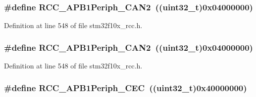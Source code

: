 \subsubsection[{\texorpdfstring{R\+C\+C\+\_\+\+A\+P\+B1\+Periph\+\_\+\+C\+A\+N2}{RCC_APB1Periph_CAN2}}]{\setlength{\rightskip}{0pt plus 5cm}\#define R\+C\+C\+\_\+\+A\+P\+B1\+Periph\+\_\+\+C\+A\+N2~(({\bf uint32\+\_\+t})0x04000000)}\hypertarget{group___a_p_b1__peripheral_ga62801597b97816751c038acb1466179c}{}\label{group___a_p_b1__peripheral_ga62801597b97816751c038acb1466179c}


Definition at line 548 of file stm32f10x\+\_\+rcc.\+h.

\subsubsection[{\texorpdfstring{R\+C\+C\+\_\+\+A\+P\+B1\+Periph\+\_\+\+C\+A\+N2}{RCC_APB1Periph_CAN2}}]{\setlength{\rightskip}{0pt plus 5cm}\#define R\+C\+C\+\_\+\+A\+P\+B1\+Periph\+\_\+\+C\+A\+N2~(({\bf uint32\+\_\+t})0x04000000)}\hypertarget{group___a_p_b1__peripheral_ga62801597b97816751c038acb1466179c}{}\label{group___a_p_b1__peripheral_ga62801597b97816751c038acb1466179c}


Definition at line 548 of file stm32f10x\+\_\+rcc.\+h.

\subsubsection[{\texorpdfstring{R\+C\+C\+\_\+\+A\+P\+B1\+Periph\+\_\+\+C\+EC}{RCC_APB1Periph_CEC}}]{\setlength{\rightskip}{0pt plus 5cm}\#define R\+C\+C\+\_\+\+A\+P\+B1\+Periph\+\_\+\+C\+EC~(({\bf uint32\+\_\+t})0x40000000)}\hypertarget{group___a_p_b1__peripheral_gaa96437b649e13586945f40dac318a0ae}{}\label{group___a_p_b1__peripheral_gaa96437b649e13586945f40dac318a0ae}



